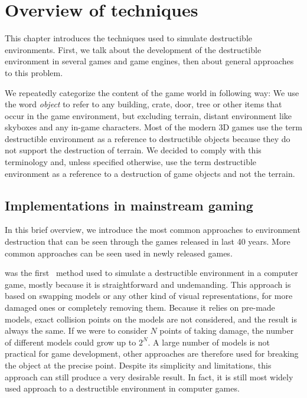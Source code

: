 \chapter{Overview of techniques}
\label{chapt:over}
This chapter introduces the techniques used to simulate destructible environments. First, we talk about the development of the destructible environment in several games and game engines, then about general approaches to this problem.

We repeatedly categorize the content of the game world in following way: We use the word \emph{object} to refer to any building, crate, door, tree or other items that occur in the game environment, but excluding terrain, distant environment like skyboxes and any in-game characters. Most of the modern 3D games use the term destructible environment as a reference to destructible objects because they do not support the destruction of terrain. We decided to comply with this terminology and, unless specified otherwise, use the term destructible environment as a reference to a destruction of game objects and not the terrain.

\section{Implementations in mainstream gaming}
\label{sec:common}
In this brief overview, we introduce the most common approaches to environment destruction that can be seen through the games released in last 40 years. More common approaches can be seen used in newly released games.

 was the first~\cite{history} method used to simulate a destructible environment in a computer game, mostly because it is straightforward and undemanding. This approach is based on swapping models or any other kind of visual representations, for more damaged ones or completely removing them. Because it relies on pre-made models, exact collision points on the models are not considered, and the result is always the same. If we were to consider $N$ points of taking damage, the number of different models could grow up to $2^N$. A large number of models is not practical for game development, other approaches are therefore used for breaking the object at the precise point. Despite its simplicity and limitations, this approach can still produce a very desirable result. In fact, it is still most widely used approach to a destructible environment in computer games.

